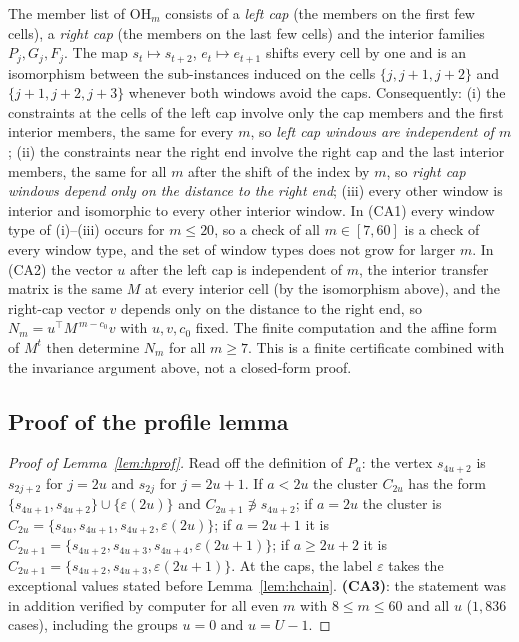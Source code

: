  The member list of $\mathrm{OH}_m$ consists of a \emph{left cap} (the members on the first few cells), a \emph{right cap} (the members on the last few cells) and the interior families $P_j,G_j,F_j$. The map $s_t\mapsto s_{t+2}$, $e_t\mapsto e_{t+1}$ shifts every cell by one and is an isomorphism between the sub-instances induced on the cells $\{j,j+1,j+2\}$ and $\{j+1,j+2,j+3\}$ whenever both windows avoid the caps. Consequently: (i) the constraints at the cells of the left cap involve only the cap members and the first interior members, the same for every $m$, so \emph{left cap windows are independent of $m$}; (ii) the constraints near the right end involve the right cap and the last interior members, the same for all $m$ after the shift of the index by $m$, so \emph{right cap windows depend only on the distance to the right end}; (iii) every other window is interior and isomorphic to every other interior window. In (CA1) every window type of (i)--(iii) occurs for $m\le20$, so a check of all $m\in[7,60]$ is a check of every window type, and the set of window types does not grow for larger $m$. In (CA2) the vector $u$ after the left cap is independent of $m$, the interior transfer matrix is the same $M$ at every interior cell (by the isomorphism above), and the right-cap vector $v$ depends only on the distance to the right end, so $N_m=u^{\top}M^{\,m-c_0}v$ with $u,v,c_0$ fixed. The finite computation and the affine form of $M^t$ then determine $N_m$ for all $m\ge7$. This is a finite certificate combined with the invariance argument above, not a closed-form proof.
\subsection{Proof of the profile lemma}
\begin{proof}[Proof of Lemma~\ref{lem:hprof}]
Read off the definition of $P_a$: the vertex $s_{4u+2}$ is $s_{2j+2}$ for $j=2u$ and $s_{2j}$ for $j=2u+1$. If $a<2u$ the cluster $C_{2u}$ has the form $\{s_{4u+1},s_{4u+2}\}\cup\{\varepsilon(2u)\}$ and $C_{2u+1}\not\ni s_{4u+2}$; if $a=2u$ the cluster is $C_{2u}=\{s_{4u},s_{4u+1},s_{4u+2},\varepsilon(2u)\}$; if $a=2u+1$ it is $C_{2u+1}=\{s_{4u+2},s_{4u+3},s_{4u+4},\varepsilon(2u+1)\}$; if $a\ge2u+2$ it is $C_{2u+1}=\{s_{4u+2},s_{4u+3},\varepsilon(2u+1)\}$. At the caps, the label $\varepsilon$ takes the exceptional values stated before Lemma~\ref{lem:hchain}. \textbf{(CA3)}: the statement was in addition verified by computer for all even $m$ with $8\le m\le60$ and all $u$ ($1{,}836$ cases), including the groups $u=0$ and $u=U-1$.
\end{proof}
